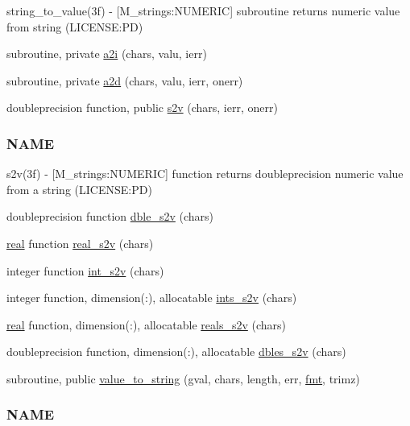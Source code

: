\begin{DoxyCompactItemize}
\begin{DoxyCompactList}
string\+\_\+to\+\_\+value(3f) -\/ \mbox{[}M\+\_\+strings\+:N\+U\+M\+E\+R\+IC\mbox{]} subroutine returns numeric value from string (L\+I\+C\+E\+N\+SE\+:PD) \end{DoxyCompactList}\item 
subroutine, private \mbox{\hyperlink{namespacem__strings_aca902af295ede82fb0c45174bbfe6eef}{a2i}} (chars, valu, ierr)
\item 
subroutine, private \mbox{\hyperlink{namespacem__strings_a8a18024e04cc697243355de3d61e171c}{a2d}} (chars, valu, ierr, onerr)
\item 
doubleprecision function, public \mbox{\hyperlink{namespacem__strings_ae0e2fe7c93e581402a74a7b59e5bb07f}{s2v}} (chars, ierr, onerr)
\begin{DoxyCompactList}\small\item\em \subsubsection*{N\+A\+ME}

s2v(3f) -\/ \mbox{[}M\+\_\+strings\+:N\+U\+M\+E\+R\+IC\mbox{]} function returns doubleprecision numeric value from a string (L\+I\+C\+E\+N\+SE\+:PD) \end{DoxyCompactList}\item 
doubleprecision function \mbox{\hyperlink{namespacem__strings_a970d99e3a2ab426bb90d6ea90bcc588a}{dble\+\_\+s2v}} (chars)
\item 
\mbox{\hyperlink{interfacem__strings_1_1real}{real}} function \mbox{\hyperlink{namespacem__strings_aac80fa95c07cf00d5442a88962c5e6e9}{real\+\_\+s2v}} (chars)
\item 
integer function \mbox{\hyperlink{namespacem__strings_aa94164439fc7659e175cf639e7315c0d}{int\+\_\+s2v}} (chars)
\item 
integer function, dimension(\+:), allocatable \mbox{\hyperlink{namespacem__strings_a4e54d205168cab37d25119d74a9ead63}{ints\+\_\+s2v}} (chars)
\item 
\mbox{\hyperlink{interfacem__strings_1_1real}{real}} function, dimension(\+:), allocatable \mbox{\hyperlink{namespacem__strings_ac62b68d2aeb2b404a3340101f2cb7f84}{reals\+\_\+s2v}} (chars)
\item 
doubleprecision function, dimension(\+:), allocatable \mbox{\hyperlink{namespacem__strings_ab463f9b431dd817b7b509608ec823b0f}{dbles\+\_\+s2v}} (chars)
\item 
subroutine, public \mbox{\hyperlink{namespacem__strings_a5dcd73626c8909c12f8ea29028927a88}{value\+\_\+to\+\_\+string}} (gval, chars, length, err, \mbox{\hyperlink{namespacem__strings_afccf1e453a4315a639f133f2f7c0078b}{fmt}}, trimz)
\begin{DoxyCompactList}\small\item\em \subsubsection*{N\+A\+ME}


\end{DoxyCompactList}
\end{DoxyCompactItemize}
